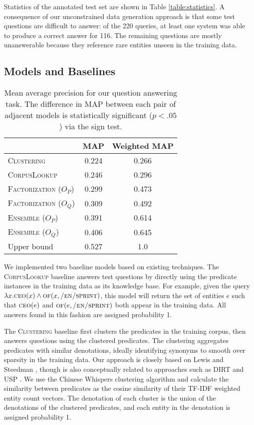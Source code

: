 \documentclass[11pt]{article}
\newcommand{\pred}[1]{\textsc{#1}}
\newcommand{\clb}{\textsc{CorpusLookup}}
\newcommand{\cb}{\textsc{Clustering}}
\newcommand{\uspr}{\textsc{Factorization} (\ensuremath{O_P})}
\newcommand{\usqr}{\textsc{Factorization} (\ensuremath{O_Q})}
\newcommand{\epr}{\textsc{Ensemble} (\ensuremath{O_P})}
\newcommand{\eqr}{\textsc{Ensemble} (\ensuremath{O_Q})}
\begin{document}
Statistics of the annotated test set are shown in Table
\ref{table:statistics}. A consequence of our unconstrained data
generation approach is that some test questions are difficult to
answer: of the 220 queries, at least one system was able to produce a
correct answer for 116. The remaining questions are mostly
unanswerable because they reference rare entities unseen in the
training data.



\subsection{Models and Baselines}


\begin{table}
\centering
{\small
\begin{tabular}{lcc} \toprule
 & MAP & Weighted MAP \\ \midrule
\cb{} & 0.224 & 0.266 \\
\clb{} & 0.246 & 0.296 \\ \midrule
\uspr{} & 0.299 & 0.473 \\
\usqr{} & 0.309 & 0.492 \\ \midrule
\epr{} & 0.391 & 0.614 \\ 
\eqr{} & 0.406 & 0.645 \\ \midrule
Upper bound & 0.527 & 1.0 \\ \bottomrule
\end{tabular}
}
\vspace{-.08in}
\caption{Mean average precision for our question answering task. The
  difference in MAP between each pair of adjacent models is
  statistically significant ($p < .05$) via the sign test.}
\label{table:results}
\vspace{-.15in}
\end{table}


We implemented two baseline models based on existing techniques. The
\pred{CorpusLookup} baseline answers test questions by directly using
the predicate instances in the training data as its knowledge
base. For example, given the query $\lambda x.\pred{ceo}(x) \wedge
\pred{of}(x, \pred{/en/sprint})$, this model will return the set of
entities $e$ such that $\pred{ceo}(e)$ and $\pred{of}(e,
\pred{/en/sprint})$ both appear in the training data. All answers
found in this fashion are assigned probability 1.

The \pred{Clustering} baseline first clusters the predicates in the
training corpus, then answers questions using the clustered
predicates. The clustering aggregates predicates with similar
denotations, ideally identifying synonyms to smooth over sparsity in
the training data. Our approach is closely based on Lewis and Steedman
, though is also conceptually related to
approaches such as DIRT \cite{lin2001} and USP
\cite{poon2009unsupervised}. We use the Chinese Whispers clustering
algorithm \cite{biemann2006} and calculate the similarity between
predicates as the cosine similarity of their TF-IDF weighted entity
count vectors. The denotation of each cluster is the union of the
denotations of the clustered predicates, and each entity in the
denotation is assigned probability 1.
\end{document}
